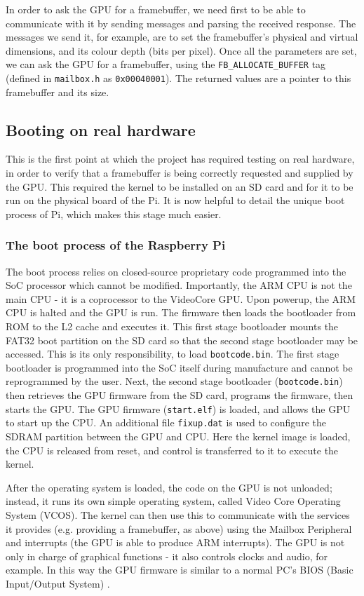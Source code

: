 \documentclass[10pt,a4paper]{article}
\newcommand{\code}[1]{\texttt{#1}}
\begin{document}
In order to ask the GPU for a framebuffer, we need first to be able to
communicate with it by sending messages and parsing the received response. The
messages we send it, for example, are to set the framebuffer's physical and
virtual dimensions, and its colour depth (bits per pixel). Once all the
parameters are set, we can ask the GPU for a framebuffer, using the
\code{FB\_ALLOCATE\_BUFFER} tag (defined in \code{mailbox.h} as
\code{0x00040001}). The returned values are a pointer to this framebuffer and its
size. 

\subsection{Booting on real hardware}
This is the first point at which the project has required testing on real
hardware, in order to verify that a framebuffer is being correctly requested and
supplied by the GPU. This required the kernel to be installed on an SD card and
for it to be run on the physical board of the Pi. It is now helpful to detail
the unique boot process of Pi, which makes this stage much easier.

\subsubsection{The boot process of the Raspberry Pi}
The boot process relies on closed-source proprietary code programmed into the
SoC processor \cite{Firmware} which cannot be modified. Importantly, the ARM CPU
is not the main CPU - it is a coprocessor to the VideoCore GPU. Upon powerup,
the ARM CPU is halted and the GPU is run. The firmware then loads the bootloader
from ROM to the L2 cache and executes it.  This first stage bootloader mounts
the FAT32 boot partition on the SD card so that the second stage bootloader may
be accessed.  This is its only responsibility, to load \code{bootcode.bin}. The
first stage bootloader is programmed into the SoC itself during manufacture and
cannot be reprogrammed by the user.  Next, the second stage bootloader
(\code{bootcode.bin}) then retrieves the GPU firmware from the SD card, programs
the firmware, then starts the GPU. The GPU firmware (\code{start.elf}) is
loaded, and allows the GPU to start up the CPU. An additional file
\code{fixup.dat} is used to configure the SDRAM partition between the GPU and
CPU.  Here the kernel image is loaded, the CPU is released from reset, and
control is transferred to it to execute the kernel.

After the operating system is loaded, the code on the GPU is not unloaded;
instead, it runs its own simple operating system, called Video Core Operating
System (VCOS). The kernel can then use this to communicate with the services it
provides (e.g. providing a framebuffer, as above) using the Mailbox Peripheral
and interrupts (the GPU is able to produce ARM interrupts). The GPU is not only
in charge of graphical functions - it also controls clocks and audio, for
example. In this way the GPU firmware is similar to a normal PC's BIOS (Basic
Input/Output System) \cite{Boot1, Boot2}.
\end{document}
